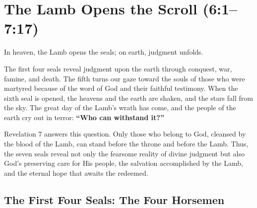 \chapter{The Lamb Opens the Scroll (6:1--7:17)}

In heaven, the Lamb opens the seals; on earth, judgment unfolds.

The first four seals reveal judgment upon the earth through conquest, war, famine, and death. The fifth turns our gaze toward the souls of those who were martyred because of the word of God and their faithful testimony. When the sixth seal is opened, the heavens and the earth are shaken, and the stars fall from the sky. The great day of the Lamb's wrath has come, and the people of the earth cry out in terror: \textbf{``Who can withstand it?''}

Revelation 7 answers this question. Only those who belong to God, cleansed by the blood of the Lamb, can stand before the throne and before the Lamb. Thus, the seven seals reveal not only the fearsome reality of divine judgment but also God's preserving care for His people, the salvation accomplished by the Lamb, and the eternal hope that awaits the redeemed.

\section{The First Four Seals: The Four Horsemen}



